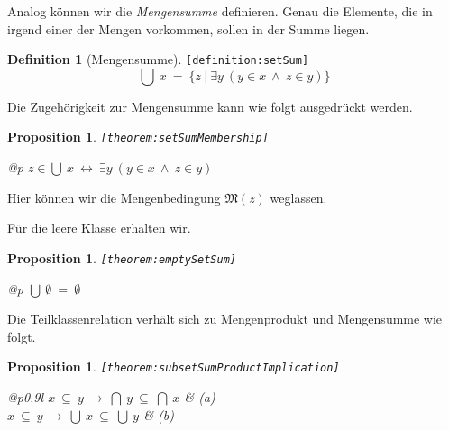 \documentclass[a4paper,german,10pt,twoside]{book}
\newtheorem{prop}[thm]{Proposition}
\theoremstyle{definition}
\newtheorem{defn}{Definition}
\theoremstyle{remark}
\begin{document}
\par
Analog k{\"o}nnen wir die \emph{Mengensumme} definieren.
Genau die Elemente, die in irgend einer der Mengen vorkommen, sollen in der Summe liegen.

\begin{defn}[Mengensumme]
\label{definition:setSum} \hypertarget{definition:setSum}{}
{\tt \tiny [\verb]definition:setSum]]}
$$\bigcup \ x \ = \ \{ z \ | \ \exists y\ (y \in x\ \land\ z \in y) \} $$
\end{defn}


\par
Die Zugeh{\"o}rigkeit zur Mengensumme kann wie folgt ausgedr{\"u}ckt werden.

\begin{prop}
\label{theorem:setSumMembership} \hypertarget{theorem:setSumMembership}{}
{\tt \tiny [\verb]theorem:setSumMembership]]}
\mbox{}
\begin{longtable}{{@{\extracolsep{\fill}}p{\linewidth}}}
\centering $z \in \bigcup \ x\ \leftrightarrow\ \exists y\ (y \in x\ \land\ z \in y)$
\end{longtable}

\end{prop}

Hier k{\"o}nnen wir die Mengenbedingung $\mathfrak{M}(z)$ weglassen.


\par
F{\"u}r die leere Klasse erhalten wir.

\begin{prop}
\label{theorem:emptySetSum} \hypertarget{theorem:emptySetSum}{}
{\tt \tiny [\verb]theorem:emptySetSum]]}
\mbox{}
\begin{longtable}{{@{\extracolsep{\fill}}p{\linewidth}}}
\centering $\bigcup \ \emptyset \ = \ \emptyset$
\end{longtable}

\end{prop}


\par
Die Teilklassenrelation verh{\"a}lt sich zu Mengenprodukt und Mengensumme wie folgt.

\begin{prop}
\label{theorem:subsetSumProductImplication} \hypertarget{theorem:subsetSumProductImplication}{}
{\tt \tiny [\verb]theorem:subsetSumProductImplication]]}
\mbox{}
\begin{longtable}{{@{\extracolsep{\fill}}p{0.9\linewidth}l}}
\centering $x \ \subseteq \ y\ \rightarrow\ \bigcap \ y \ \subseteq \ \bigcap \ x$ & \label{theorem:subsetSumProductImplication/a} \hypertarget{theorem:subsetSumProductImplication/a}{} \mbox{\emph{(a)}} \\
\centering $x \ \subseteq \ y\ \rightarrow\ \bigcup \ x \ \subseteq \ \bigcup \ y$ & \label{theorem:subsetSumProductImplication/b} \hypertarget{theorem:subsetSumProductImplication/b}{} \mbox{\emph{(b)}} 
\end{longtable}

\end{prop}
\end{document}
